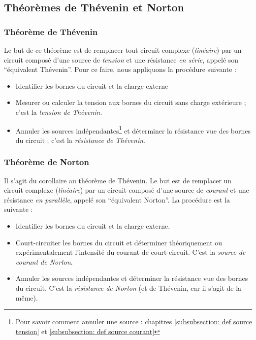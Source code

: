 \documentclass[12pt,a4paper]{article}
\begin{document}
\subsection{Théorèmes de Thévenin et Norton}
\subsubsection{Théorème de Thévenin}
Le but de ce théorème est de remplacer tout circuit complexe (\textit{linéaire}) par un circuit composé d'une source de \textit{tension} et une résistance \textit{en série}, appelé son ``équivalent Thévenin''. Pour ce faire, nous appliquons la procédure suivante :
\begin{boite}
	\begin{itemize}
		\item 	Identifier les bornes du circuit et la charge externe
		\item 	Mesurer ou calculer la tension aux bornes du circuit sans charge extérieure ; c'est la \textit{tension de Thévenin}.
		\item 	Annuler les sources indépendantes\footnote{Pour savoir comment annuler une source : chapitres \ref{subsubsection: def source tension} et 	\ref{subsubsection: def source courant}} et déterminer la résistance vue des bornes du circuit ; c'est la \textit{résistance de Thévenin}.
	\end{itemize}
\end{boite}

\subsubsection{Théorème de Norton}
Il s'agit du corollaire au théorème de Thévenin. Le but est de remplacer un circuit complexe (\textit{linéaire}) par un circuit composé d'une source de \textit{courant} et une résistance \textit{en parallèle}, appelé son ``équivalent Norton''. La procédure est la suivante :
\begin{itemize}
	\item 	Identifier les bornes du circuit et la charge externe.
	\item 	Court-circuiter les bornes du circuit et déterminer théoriquement ou expérimentalement l'intensité du courant de court-circuit. C'est la \textit{source de courant de Norton}.
	\item 	Annuler les sources indépendantes et déterminer la résistance vue des bornes du circuit. C'est la \textit{résistance de Norton} (et de Thévenin, car il s'agit de la même).
\end{itemize}
\end{document}
